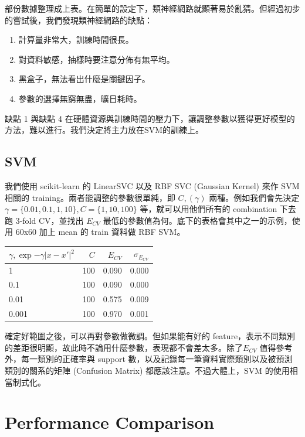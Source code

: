 部份數據整理成上表。在簡單的設定下，類神經網路就顯著易於亂猜。但經過初步的嘗試後，我們發現類神經網路的缺點：
\begin{enumerate}[itemsep=-1ex, topsep=0ex]
\item 計算量非常大，訓練時間很長。
\item 對資料敏感，抽樣時要注意分佈有無平均。
\item 黑盒子，無法看出什麼是關鍵因子。
\item 參數的選擇無窮無盡，曠日耗時。
\end{enumerate}
缺點 1 與缺點 4 在硬體資源與訓練時間的壓力下，讓調整參數以獲得更好模型的方法，難以進行。我們決定將主力放在SVM的訓練上。

\subsection*{SVM}
我們使用 scikit-learn 的 LinearSVC 以及 RBF SVC (Gaussian Kernel) 來作 SVM 相關的 training。兩者能調整的參數很單純，即 $C, (\gamma)$ 兩種。例如我們會先決定 $\gamma = \{0.01, 0.1, 1, 10\}, C = \{1, 10, 100\}$ 等，就可以用他們所有的 combination 下去跑 3-fold CV，並找出 $E_{CV}$ 最低的參數值為何。底下的表格會其中之一的示例，使用 60x60 加上 mean 的 train 資料做 RBF SVM。

\begin{table}[htb]
\centering
\begin{threeparttable}
    \begin{tabular}{lrrr}
        \toprule
        $\gamma, \exp{-\gamma |x - x'|^2}$ & $C$ & $E_{CV}$ & $\sigma_{E_{CV}}$\\
        \midrule
        1&     100&   0.090  & 0.000\\
        0.1&   100&   0.090  & 0.000\\
        0.01&  100&   0.575  & 0.009\\
        0.001& 100&   0.970  & 0.001\\
        \bottomrule
    \end{tabular}
\end{threeparttable}
\end{table}

確定好範圍之後，可以再對參數做微調。但如果能有好的 feature，表示不同類別的差距很明顯，故此時不論用什麼參數，表現都不會差太多。除了$E_{CV}$ 值得參考外，每一類別的正確率與 support 數，以及記錄每一筆資料實際類別以及被預測類別的關系的矩陣 (Confusion Matrix) 都應該注意。不過大體上，SVM 的使用相當制式化。


\section{Performance Comparison}

